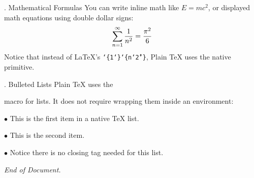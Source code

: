 \vskip 0.25in

{. Mathematical Formulas}
\medskip
You can write inline math like $E = mc^2$, or displayed math equations using
double dollar signs:
$$ \sum_{n=1}^{\infty} {1 \over n^2} = {\pi^2 \over 6} $$
Notice that instead of \LaTeX's \vbox{\tt\string\frac\char`\{1\char`\}\char`\{n\char`\^2\char`\}}, Plain TeX uses the
native {\tt\string\over} primitive.

\vskip 0.25in

{. Bulleted Lists}
\medskip
Plain TeX uses the {\tt\string\item} macro for lists. It does not require wrapping
them inside an environment:

\item{$\bullet$} This is the first item in a native TeX list.
\item{$\bullet$} This is the second item.
\item{$\bullet$} Notice there is no closing tag needed for this list.

\vskip 0.5in
\centerline{\it End of Document.}

\bye

